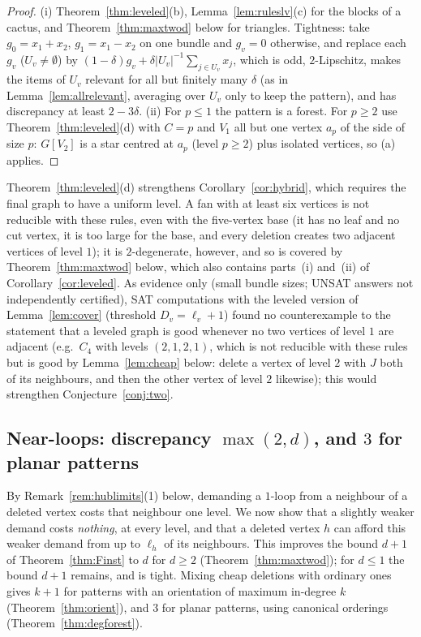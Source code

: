 \documentclass[11pt,letterpaper]{article}
\theoremstyle{definition}
\begin{document}
\begin{proof}
(i) Theorem~\ref{thm:leveled}(b), Lemma~\ref{lem:ruleslv}(c) for the blocks of a cactus, and
Theorem~\ref{thm:maxtwod} below for triangles. Tightness: take $g_0=x_1+x_2$, $g_1=x_1-x_2$ on one bundle and $g_v=0$ otherwise, and replace
each $g_v$ ($U_v\ne\emptyset$) by $(1-\delta)g_v+\delta|U_v|^{-1}\sum_{j\in U_v}x_j$, which is odd,
$2$-Lipschitz, makes the items of $U_v$ relevant for all but finitely many $\delta$ (as in
Lemma~\ref{lem:allrelevant}, averaging over $U_v$ only to keep the pattern), and has discrepancy at
least $2-3\delta$. (ii) For $p\le1$ the pattern is a forest. For $p\ge2$ use
Theorem~\ref{thm:leveled}(d) with $C=p$ and $V_1$ all but one vertex $a_p$ of the side of size $p$:
$G[V_2]$ is a star centred at $a_p$ (level $p\ge2$) plus isolated vertices, so (a) applies.
\end{proof}

Theorem~\ref{thm:leveled}(d) strengthens Corollary~\ref{cor:hybrid}, which requires the final graph
to have a uniform level. A fan with at least six vertices is not reducible with these rules, even with the five-vertex base
(it has no leaf and no cut vertex, it is too large for the base, and every deletion creates two
adjacent vertices of level $1$); it is $2$-degenerate, however, and so is covered by
Theorem~\ref{thm:maxtwod} below, which also contains parts~(i) and~(ii) of
Corollary~\ref{cor:leveled}. As evidence
only (small bundle sizes; UNSAT answers not independently certified), SAT computations with the
leveled version of Lemma~\ref{lem:cover} (threshold $D_v=\ell_v+1$) found no counterexample to the
statement that a leveled graph is good whenever no two vertices of level $1$ are adjacent (e.g.\
$C_4$ with levels $(2,1,2,1)$, which is not reducible with these rules but is good by
Lemma~\ref{lem:cheap} below: delete a vertex of level $2$ with $J$ both of its neighbours, and then the
other vertex of level $2$ likewise); this would strengthen
Conjecture~\ref{conj:two}.

\subsection{Near-loops: discrepancy \texorpdfstring{$\max(2,d)$}{max(2,d)}, and \texorpdfstring{$3$}{3} for planar patterns}\label{sec:nearloops}

By Remark~\ref{rem:hublimits}(1) below, demanding a $1$-loop from a neighbour of a deleted vertex costs
that neighbour one level. We now show that a slightly weaker demand costs \emph{nothing}, at every level,
and that a deleted vertex $h$ can afford this weaker demand from up to $\ell_h$ of its neighbours. This
improves the bound $d+1$ of Theorem~\ref{thm:Finst} to $d$ for $d\ge2$ (Theorem~\ref{thm:maxtwod}); for
$d\le1$ the bound $d+1$ remains, and is tight. Mixing cheap deletions with ordinary ones gives $k+1$ for
patterns with an orientation of maximum in-degree $k$ (Theorem~\ref{thm:orient}), and $3$ for planar
patterns, using canonical orderings (Theorem~\ref{thm:degforest}).
\end{document}
